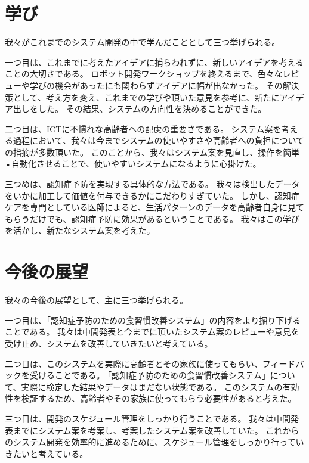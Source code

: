 \documentclass[../report]{subfiles}
\begin{document}
\section{学び}
我々がこれまでのシステム開発の中で学んだこととして三つ挙げられる。

一つ目は、これまでに考えたアイデアに捕らわれずに、新しいアイデアを考えることの大切さである。
ロボット開発ワークショップを終えるまで、色々なレビューや学びの機会があったにも関わらずアイデアに幅が出なかった。
その解決策として、考え方を変え、これまでの学びや頂いた意見を参考に、新たにアイデア出しをした。
その結果、システムの方向性を決めることができた。

二つ目は、ICTに不慣れな高齢者への配慮の重要さである。
システム案を考える過程において、我々は今までシステムの使いやすさや高齢者への負担についての指摘が多数頂いた。
このことから、我々はシステム案を見直し、操作を簡単•自動化させることで、使いやすいシステムになるように心掛けた。

三つめは、認知症予防を実現する具体的な方法である。
我々は検出したデータをいかに加工して価値を付与できるかにこだわりすぎていた。
しかし、認知症ケアを専門としている医師によると、生活パターンのデータを高齢者自身に見てもらうだけでも、認知症予防に効果があるということである。
我々はこの学びを活かし、新たなシステム案を考えた。


\section{今後の展望}
我々の今後の展望として、主に三つ挙げられる。

一つ目は、｢認知症予防のための食習慣改善システム」の内容をより掘り下げることである。
我々は中間発表と今までに頂いたシステム案のレビューや意見を受け止め、システムを改善していきたいと考えている。

二つ目は、このシステムを実際に高齢者とその家族に使ってもらい、フィードバックを受けることである。
｢認知症予防のための食習慣改善システム」について、実際に検定した結果やデータはまだない状態である。
このシステムの有効性を検証するため、高齢者やその家族に使ってもらう必要性があると考えた。

三つ目は、開発のスケジュール管理をしっかり行うことである。
我々は中間発表までにシステム案を考案し、考案したシステム案を改善していた。
これからのシステム開発を効率的に進めるために、スケジュール管理をしっかり行っていきたいと考えている。
\end{document}
